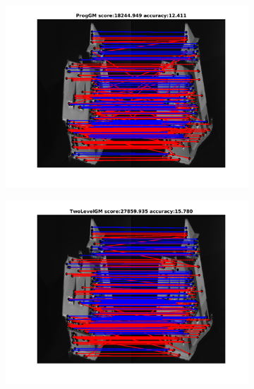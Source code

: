 \documentclass[
	fontsize=12pt,
	paper=a4,
	twoside=false,
	numbers=noenddot,
	plainheadsepline,
	toc=listof,
	toc=bibliography
]{scrartcl}
\begin{document}
\begin{figure}[h] 		
	\begin{subfigure}[b]{0.3\textwidth}
		\centering
		\includegraphics[scale=0.25]{"fig_ver2608/RealImages/House_seq/no_descr/using_cdf_afftrafo/solution/fi_1_ProgGM"}  
	\end{subfigure}%
	\begin{subfigure}[b]{0.3\textwidth}
		\centering
		\includegraphics[scale=0.25]{"fig_ver2608/RealImages/House_seq/no_descr/using_cdf_afftrafo/solution/fi_1_TwoLevelGM"}  
	\end{subfigure} 
	\begin{subfigure}[b]{0.3\textwidth}
		\centering

\end{subfigure}
\end{figure}
\end{document}
